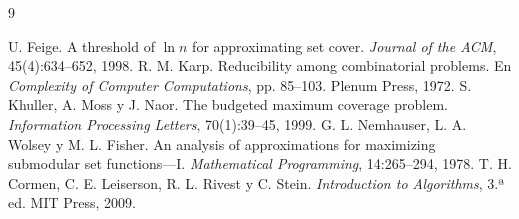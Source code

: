 \begin{thebibliography}{9}
 U. Feige. A threshold of $\ln n$ for approximating set cover.
  \emph{Journal of the ACM}, 45(4):634--652, 1998.
 R. M. Karp. Reducibility among combinatorial problems. En \emph{Complexity of
  Computer Computations}, pp. 85--103. Plenum Press, 1972.
 S. Khuller, A. Moss y J. Naor. The budgeted maximum coverage problem.
  \emph{Information Processing Letters}, 70(1):39--45, 1999.
 G. L. Nemhauser, L. A. Wolsey y M. L. Fisher. An analysis of approximations for
  maximizing submodular set functions---I. \emph{Mathematical Programming}, 14:265--294, 1978.
 T. H. Cormen, C. E. Leiserson, R. L. Rivest y C. Stein. \emph{Introduction to
  Algorithms}, 3.ª ed. MIT Press, 2009.
\end{thebibliography}
